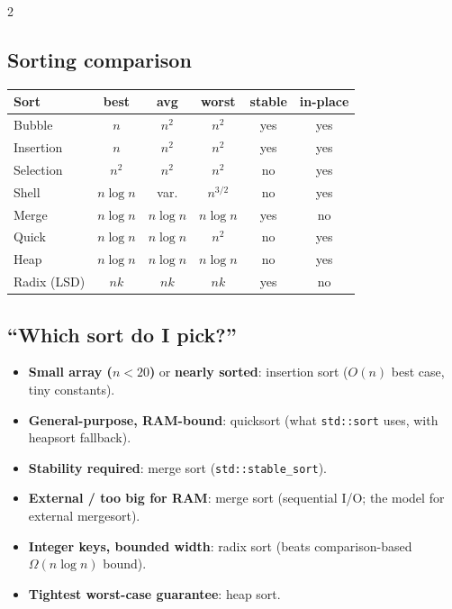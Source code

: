 \documentclass[10pt]{article}
\begin{document}
\begin{multicols}{2}
\subsection*{Sorting comparison}
\begin{tabular}{@{}l|ccc|cc@{}}
\textbf{Sort}        & \textbf{best}     & \textbf{avg}      & \textbf{worst}    & \textbf{stable} & \textbf{in-place}\\
\hline
Bubble               & $n$               & $n^2$             & $n^2$             & yes             & yes\\
Insertion            & $n$               & $n^2$             & $n^2$             & yes             & yes\\
Selection            & $n^2$             & $n^2$             & $n^2$             & no              & yes\\
Shell                & $n \log n$        & var.              & $n^{3/2}$         & no              & yes\\
Merge                & $n \log n$        & $n \log n$        & $n \log n$        & yes             & no\\
Quick                & $n \log n$        & $n \log n$        & $n^2$             & no              & yes\\
Heap                 & $n \log n$        & $n \log n$        & $n \log n$        & no              & yes\\
Radix (LSD)          & $nk$              & $nk$              & $nk$              & yes             & no
\end{tabular}

\subsection*{``Which sort do I pick?''}
\begin{itemize}
    \item \textbf{Small array ($n < 20$)} or \textbf{nearly sorted}:
    insertion sort ($O(n)$ best case, tiny constants).
    \item \textbf{General-purpose, RAM-bound}: quicksort (what
    \texttt{std::sort} uses, with heapsort fallback).
    \item \textbf{Stability required}: merge sort (\texttt{std::stable\_sort}).
    \item \textbf{External / too big for RAM}: merge sort (sequential
    I/O; the model for external mergesort).
    \item \textbf{Integer keys, bounded width}: radix sort (beats
    comparison-based $\Omega(n \log n)$ bound).
    \item \textbf{Tightest worst-case guarantee}: heap sort.
\end{itemize}


\end{multicols}
\end{document}
